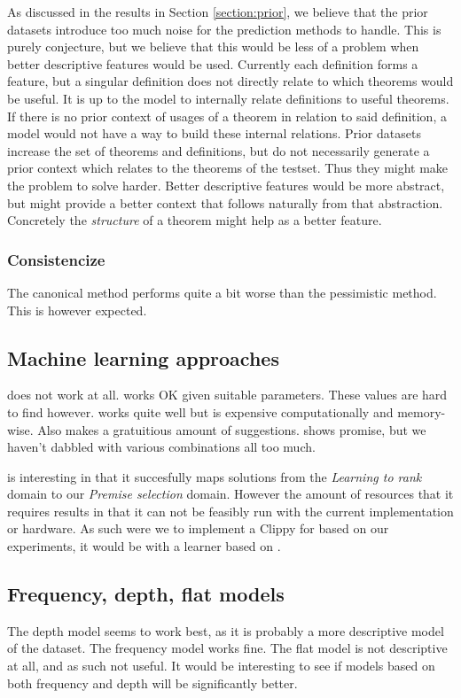 As discussed in the results in Section \ref{section:prior}, we believe that the prior datasets introduce
too much noise for the prediction methods to handle.
This is purely conjecture, but we believe that this would be less of a problem when
better descriptive features would be used.
Currently each definition forms a feature, but a singular definition does not directly relate
to which theorems would be useful.
It is up to the model to internally relate definitions to useful theorems.
If there is no prior context of usages of a theorem in relation to said definition,
a model would not have a way to build these internal relations.
Prior datasets increase the set of theorems and definitions, but do not necessarily
generate a prior context which relates to the theorems of the testset.
Thus they might make the problem to solve harder.
Better descriptive features would be more abstract, but might provide a better context that follows
naturally from that abstraction.
Concretely the \emph{structure} of a theorem might help as a better feature.

\subsubsection{Consistencize}
The canonical method performs quite a bit worse than the pessimistic method.
This is however expected.

\subsection{Machine learning approaches}
\knnadaptive does not work at all.
\nb works OK given suitable parameters. These values are hard to find however.
\adarank works quite well but is expensive computationally and memory-wise.
Also \adarank makes a gratuitious amount of suggestions.
\ensemble shows promise, but we haven't dabbled with various combinations all too much.

\adarank is interesting in that it succesfully maps solutions from
the \emph{Learning to rank} domain to our \emph{Premise selection} domain.
However the amount of resources that it requires results in that it can not be feasibly run
with the current implementation or hardware.
As such were we to implement a Clippy for \coq based on our experiments, it would be with a learner based on \ensemble.

\subsection{Frequency, depth, flat models}
The depth model seems to work best, as it is probably a more descriptive model of the dataset.
The frequency model works fine.
The flat model is not descriptive at all, and as such not useful.
It would be interesting to see if models based on both frequency and depth will be significantly better.

